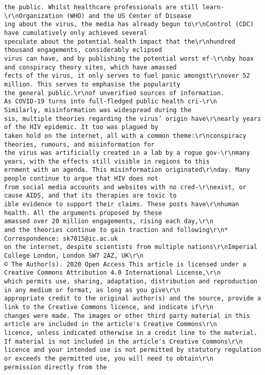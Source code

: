 \documentclass[
]{book}
\begin{document}
\begin{verbatim}
the public. Whilst healthcare professionals are still learn-\r\nOrganization (WHO) and the US Center of Disease                                        ing about the virus, the media has already begun to\r\nControl (CDC) have cumulatively only achieved several                                  speculate about the potential health impact that the\r\nhundred thousand engagements, considerably eclipsed                                    virus can have, and by publishing the potential worst ef-\r\nby hoax and conspiracy theory sites, which have amassed                                fects of the virus, it only serves to fuel panic amongst\r\nover 52 million. This serves to emphasise the popularity                               the general public.\r\nof unverified sources of information.                                                     As COVID-19 turns into full-fledged public health cri-\r\n   Similarly, misinformation was widespread during the                                 sis, multiple theories regarding the virus’ origin have\r\nearly years of the HIV epidemic. It too was plagued by                                 taken hold on the internet, all with a common theme:\r\nconspiracy theories, rumours, and misinformation for                                   the virus was artificially created in a lab by a rogue gov-\r\nmany years, with the effects still visible in regions to this                          ernment with an agenda. This misinformation originated\r\nday. Many people continue to argue that HIV does not                                   from social media accounts and websites with no cred-\r\nexist, or cause AIDS, and that its therapies are toxic to                              ible evidence to support their claims. These posts have\r\nhuman health. All the arguments proposed by these                                      amassed over 20 million engagements, rising each day,\r\n                                                                                       and the theories continue to gain traction and following\r\n* Correspondence: sk7015@ic.ac.uk                                                      on the internet, despite scientists from multiple nations\r\nImperial College London, London SW7 2AZ, UK\r\n                                      © The Author(s). 2020 Open Access This article is licensed under a Creative Commons Attribution 4.0 International License,\r\n                                      which permits use, sharing, adaptation, distribution and reproduction in any medium or format, as long as you give\r\n                                      appropriate credit to the original author(s) and the source, provide a link to the Creative Commons licence, and indicate if\r\n                                      changes were made. The images or other third party material in this article are included in the article's Creative Commons\r\n                                      licence, unless indicated otherwise in a credit line to the material. If material is not included in the article's Creative Commons\r\n                                      licence and your intended use is not permitted by statutory regulation or exceeds the permitted use, you will need to obtain\r\n                                      permission directly from the 
\end{verbatim}
\end{document}
